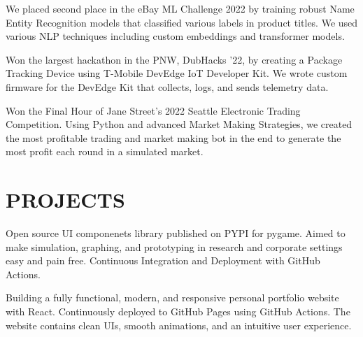 \documentclass[]{main}
\begin{document}
\begin{minipage}[t]{0.66\textwidth}
We placed second place in the eBay ML Challenge 2022 by training robust Name Entity Recognition models that classified various labels in product titles. We used various NLP techniques including custom embeddings and transformer models.
\sectionsep

Won the largest hackathon in the PNW, DubHacks '22, by creating a Package Tracking Device using T-Mobile DevEdge IoT Developer Kit. We wrote custom firmware for the DevEdge Kit that collects, logs, and sends telemetry data.
\sectionsep

Won the Final Hour of Jane Street's 2022 Seattle Electronic Trading Competition. Using Python and advanced Market Making Strategies, we created the most profitable trading and market making bot in the end to generate the most profit each round in a simulated market.
\sectionsep



\section{PROJECTS}
Open source UI componenets library published on PYPI for pygame. Aimed to make simulation, graphing, and prototyping in research and corporate settings easy and pain free. Continuous Integration and Deployment with GitHub Actions. 
\sectionsep

Building a fully functional, modern, and responsive personal portfolio website with React. Continuously deployed to GitHub Pages using GitHub Actions. The website contains clean UIs, smooth animations, and an intuitive user experience.

\sectionsep

\end{minipage} 
\end{document}
